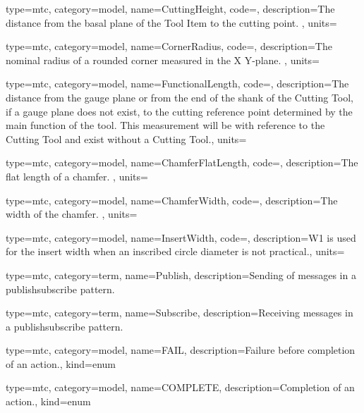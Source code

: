 {
  type=mtc,
  category=model,
  name={CuttingHeight},
  code=,
  description={The distance from the basal plane of the Tool Item to the cutting point. },
  units=
}


{
  type=mtc,
  category=model,
  name={CornerRadius},
  code=,
  description={The nominal radius of a rounded corner measured in the X Y-plane. },
  units=
}


{
  type=mtc,
  category=model,
  name={FunctionalLength},
  code=,
  description={The distance from the gauge plane or from the end of the shank of the Cutting Tool, if a gauge plane does not exist, to the cutting reference point determined by the main function of the tool. This measurement will be with reference to the Cutting Tool and \MUSTNOT exist without a Cutting Tool.},
  units=
}


{
  type=mtc,
  category=model,
  name={ChamferFlatLength},
  code=,
  description={The flat length of a chamfer. },
  units=
}


{
  type=mtc,
  category=model,
  name={ChamferWidth},
  code=,
  description={The width of the chamfer. },
  units=
}


{
  type=mtc,
  category=model,
  name={InsertWidth},
  code=,
  description={W1 is used for the insert width when an inscribed circle diameter is not practical.},
  units=
}


{
  type=mtc,
  category=term,
  name={Publish},
  description={Sending of messages in a \gls{publishsubscribe} pattern.}
}


{
  type=mtc,
  category=term,
  name={Subscribe},
  description={Receiving messages in a \gls{publishsubscribe} pattern.}
}



{
  type=mtc,
  category=model,
  name={FAIL},
  description={Failure before completion of an action.},
  kind={enum}
}


{
  type=mtc,
  category=model,
  name={COMPLETE},
  description={Completion of an action.},
  kind={enum}
}


